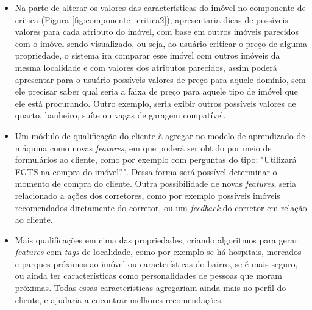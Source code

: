 \begin{itemize}
  \item Na parte de alterar os valores das características do imóvel no componente de crítica (Figura \ref{fig:componente_critica2}), apresentaria dicas de possíveis valores para cada atributo do imóvel, com base em outros imóveis parecidos com o imóvel sendo visualizado, ou seja, ao usuário criticar o preço de alguma propriedade, o sistema ira comparar esse imóvel com outros imóveis da mesma localidade e com valores dos atributos parecidos, assim poderá apresentar para o usuário possíveis valores de preço para aquele domínio, sem ele precisar saber qual seria a faixa de preço para aquele tipo de imóvel que ele está procurando. Outro exemplo, seria exibir outros possíveis valores de quarto, banheiro, suíte ou vagas de garagem compatível.


 \item Um módulo de qualificação do cliente à agregar no modelo de aprendizado de máquina como novas \textit{features}, em que poderá ser obtido por meio de formulários ao cliente, como por exemplo com perguntas do tipo: "Utilizará FGTS na compra do imóvel?". Dessa forma será possível determinar o momento de compra do cliente. Outra possibilidade de novas \textit{features}, seria relacionado a ações dos corretores, como por exemplo possíveis imóveis recomendados diretamente do corretor, ou um \textit{feedback} do corretor em relação ao cliente.
  

\item Mais qualificações em cima das propriedades, criando algoritmos para gerar \textit{features} com \textit{tags} de localidade, como por exemplo se há hospitais, mercados e parques próximos ao imóvel ou características do bairro, se é mais seguro, ou ainda ter características como personalidades de pessoas que moram próximas. Todas essas características agregariam ainda mais no perfil do cliente, e ajudaria a encontrar melhores recomendações.
\end{itemize}

